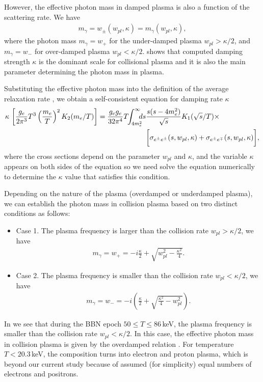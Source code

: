 However, the effective photon mass in damped plasma is also a function of the scattering rate. We have
\begin{align}\label{PhotonMass_self}
m_\gamma=w_\pm(w_{pl},\kappa)=m_\gamma(w_{pl},\kappa),
\end{align}
where the photon mass $m_\gamma=w_+$ for the under-damped plasma $w_{pl}>\kappa/2$, and $m_\gamma=w_-$ for over-damped plasma $w_{pl}<\kappa/2$.  shows that computed damping strength $\kappa$ is the dominant scale for collisional plasma and it is also the main parameter determining the photon mass in plasma. 

Substituting the effective photon mass   into the definition of the average relaxation rate , we obtain a self-consistent equation for damping rate $\kappa$   
\begin{align}\label{RealaxtionSelf}
\kappa\,\left[\frac{g_e}{2\pi^3}T^3\left(\frac{m_e}{T}\right)^2K_2(m_e/T)\right]=\frac{g_eg_e}{32\pi^4}T\!\! \int_{4m_e^2}^\infty\!\!\!\!ds&
\frac{s(s-4m^2_e)}{\sqrt{s}}K_1(\sqrt{s}/T)\times\\&\notag
\bigg[\sigma_{e^\pm e^\pm}(s,w_{pl},\kappa)+\sigma_{e^\pm e^\mp}(s,w_{pl},\kappa)\bigg],
\end{align}
where the cross sections depend on the parameter $w_{pl}$ and $\kappa$, and the variable $\kappa$ appears on both sides of the equation so we need solve the equation numerically to determine the $\kappa$ value that satisfies this condition.


Depending on the nature of the plasma (overdamped or underdamped plasma), we can establish the photon mass in collision plasma based on two distinct conditions as follows:
\begin{itemize}
\item Case 1. The plasma frequency is larger than the collision rate $w_{pl}>\kappa/2$, we have
\begin{align}
m_\gamma=w_+=-i\frac{\kappa}{2}+\sqrt{w^2_{pl}-\frac{\kappa^2}{4}}.
\end{align}
\item Case 2. The plasma frequency is smaller than the collision rate $w_{pl}<\kappa/2$, we have
\begin{align}\label{PhotonMassPlasma}
m_\gamma=w_-=-i\left(\frac{\kappa}{2}+\sqrt{\frac{\kappa^2}{4}-w^2_{pl}}\right).
\end{align}
\end{itemize}
In  we see that during the BBN epoch $50\leqslant T\leqslant 86$\,keV, the plasma frequency is smaller than the collision rate $w_{pl}<\kappa/2$.  In this case, the effective photon mass in collision plasma is given by the overdamped relation . For temperature $T<20.3$\,keV, the composition  turns into electron and proton  plasma, which is beyond our current study because of assumed (for simplicity) equal numbers of electrons and positrons.


